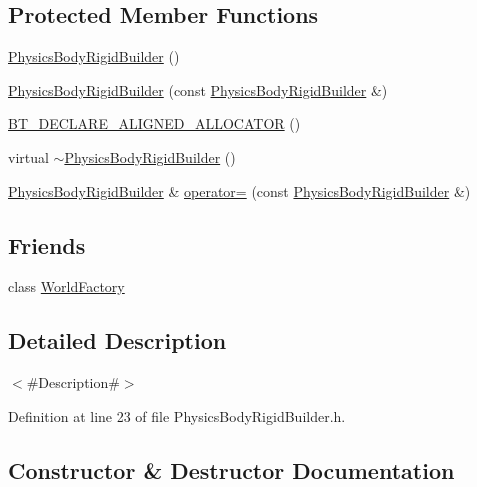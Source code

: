 \subsection*{Protected Member Functions}
\begin{DoxyCompactItemize}
\item 
\mbox{\hyperlink{classnjli_1_1_physics_body_rigid_builder_afcce4270b4b17007a8525cbf2b8902b4}{Physics\+Body\+Rigid\+Builder}} ()
\item 
\mbox{\hyperlink{classnjli_1_1_physics_body_rigid_builder_a57b327f86208d2b18dfe8001a284fbbf}{Physics\+Body\+Rigid\+Builder}} (const \mbox{\hyperlink{classnjli_1_1_physics_body_rigid_builder}{Physics\+Body\+Rigid\+Builder}} \&)
\item 
\mbox{\hyperlink{classnjli_1_1_physics_body_rigid_builder_a637cda99de6fe43af45f10c75bbfdd6e}{B\+T\+\_\+\+D\+E\+C\+L\+A\+R\+E\+\_\+\+A\+L\+I\+G\+N\+E\+D\+\_\+\+A\+L\+L\+O\+C\+A\+T\+OR}} ()
\item 
virtual \mbox{\hyperlink{classnjli_1_1_physics_body_rigid_builder_a21d3eea0cf3f2341ef21f81bd2a59113}{$\sim$\+Physics\+Body\+Rigid\+Builder}} ()
\item 
\mbox{\hyperlink{classnjli_1_1_physics_body_rigid_builder}{Physics\+Body\+Rigid\+Builder}} \& \mbox{\hyperlink{classnjli_1_1_physics_body_rigid_builder_ab2a0a2ac51dad17b770f616f369feb6d}{operator=}} (const \mbox{\hyperlink{classnjli_1_1_physics_body_rigid_builder}{Physics\+Body\+Rigid\+Builder}} \&)
\end{DoxyCompactItemize}
\subsection*{Friends}
\begin{DoxyCompactItemize}
\item 
class \mbox{\hyperlink{classnjli_1_1_physics_body_rigid_builder_acb96ebb09abe8f2a37a915a842babfac}{World\+Factory}}
\end{DoxyCompactItemize}


\subsection{Detailed Description}
$<$\#\+Description\#$>$ 

Definition at line 23 of file Physics\+Body\+Rigid\+Builder.\+h.



\subsection{Constructor \& Destructor Documentation}
\mbox{\label{classnjli_1_1_physics_body_rigid_builder_afcce4270b4b17007a8525cbf2b8902b4}} 
